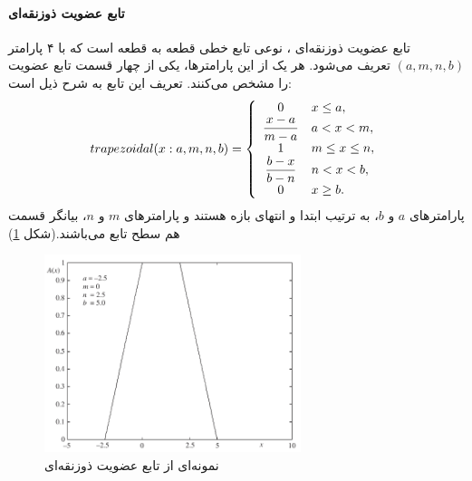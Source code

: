 \documentclass[12pt,a4paper]{article}
\theoremstyle{definition}
\begin{document}
\paragraph{تابع عضویت ذوزنقه‌ای}
تابع عضویت ذوزنقه‌ای
،
 نوعی تابع خطی قطعه به قطعه است که با ۴ پارامتر $(a, m, n, b)$ تعریف می‌شود. هر یک از این پارامترها، یکی از چهار قسمت تابع عضویت را مشخص می‌کنند. تعریف این تابع به شرح ذیل است:
\begin{equation}\label{eq:e_fset_memfunc_trapezoidal}
trapezoidal (x: a, m, n, b) = \left\{ 
\begin{array}{cl}
0 &  x \leq a, \\ 
\mathlarger{\frac{x-a}{m-a}} & a<x<m, \\ 
1 & m \leq x \leq n, \\
\mathlarger{ \frac{b-x}{b-n}} & n<x<b, \\
0 & x \geq b.
\end{array}
\right.
\end{equation}
پارامترهای $a$ و $b$، به ترتیب ابتدا و انتهای بازه هستند و پارامترهای $m$ و $n$، بیانگر قسمت هم سطح تابع می‌باشند.(شکل \ref{fig:f_15})
\cite{Pedrycz2007}
\begin{figure}[h]
	\centering 
	\includegraphics[width=75mm]{Images/Fig15.png}
	\vspace{-0.5cm}
	\caption{نمونه‌ای از تابع عضویت ذوزنقه‌ای}\label{fig:f_15}
\end{figure}
\end{document}
